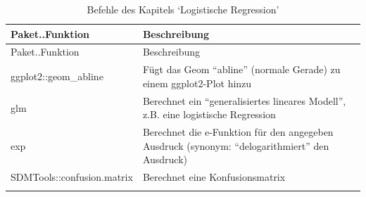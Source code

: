 \documentclass[12pt,ngerman,]{book}
\theoremstyle{definition}
\theoremstyle{definition}
\theoremstyle{remark}
\begin{document}
\begin{longtable}[]{@{}ll@{}}
\caption{Befehle des Kapitels `Logistische Regression'}\tabularnewline
\toprule
\begin{minipage}[b]{0.38\columnwidth}\raggedright\strut
Paket..Funktion\strut
\end{minipage} & \begin{minipage}[b]{0.42\columnwidth}\raggedright\strut
Beschreibung\strut
\end{minipage}\tabularnewline
\midrule
\endfirsthead
\toprule
\begin{minipage}[b]{0.38\columnwidth}\raggedright\strut
Paket..Funktion\strut
\end{minipage} & \begin{minipage}[b]{0.42\columnwidth}\raggedright\strut
Beschreibung\strut
\end{minipage}\tabularnewline
\midrule
\endhead
\begin{minipage}[t]{0.38\columnwidth}\raggedright\strut
ggplot2::geom\_abline\strut
\end{minipage} & \begin{minipage}[t]{0.42\columnwidth}\raggedright\strut
Fügt das Geom ``abline'' (normale Gerade) zu einem ggplot2-Plot
hinzu\strut
\end{minipage}\tabularnewline
\begin{minipage}[t]{0.38\columnwidth}\raggedright\strut
glm\strut
\end{minipage} & \begin{minipage}[t]{0.42\columnwidth}\raggedright\strut
Berechnet ein ``generalisiertes lineares Modell'', z.B. eine logistische
Regression\strut
\end{minipage}\tabularnewline
\begin{minipage}[t]{0.38\columnwidth}\raggedright\strut
exp\strut
\end{minipage} & \begin{minipage}[t]{0.42\columnwidth}\raggedright\strut
Berechnet die e-Funktion für den angegeben Ausdruck (synonym:
``delogarithmiert'' den Ausdruck)\strut
\end{minipage}\tabularnewline
\begin{minipage}[t]{0.38\columnwidth}\raggedright\strut
SDMTools::confusion.matrix\strut
\end{minipage} & \begin{minipage}[t]{0.42\columnwidth}\raggedright\strut
Berechnet eine Konfusionsmatrix\strut
\end{minipage}\tabularnewline
\begin{minipage}[t]{0.38\columnwidth}\raggedright\strut

\end{minipage}
\end{longtable}
\end{document}
